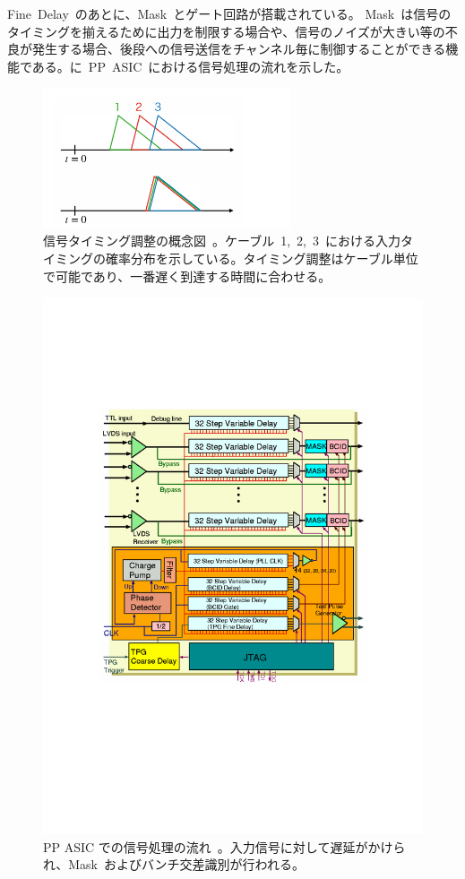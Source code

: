Fine~Delay~のあとに、Mask~とゲート回路が搭載されている。
Mask~は信号のタイミングを揃えるために出力を制限する場合や、信号のノイズが大きい等の不良が発生する場合、後段への信号送信をチャンネル毎に制御することができる機能である。に~PP~ASIC~における信号処理の流れを示した。
\begin{figure}[tbp]
        \centering   
        \includegraphics[width=0.65\textwidth,page=1]{img/slide/slide.pdf}
        \caption[信号タイミング調整の概念図]{信号タイミング調整の概念図~\cite{URL:09}。ケーブル~1,~2,~3~における入力タイミングの確率分布を示している。タイミング調整はケーブル単位で可能であり、一番遅く到達する時間に合わせる。}
        \label{fig:delay}
\end{figure}

\begin{figure}[tbp]
        \centering   
        \includegraphics[width=\textwidth,page=1]{img/pdf/PP.pdf}
        \caption[PP ASIC での信号処理の流れ]
        {PP ASIC での信号処理の流れ~\cite{URL:05}。入力信号に対して遅延がかけられ、Mask~およびバンチ交差識別が行われる。}
        \label{fig:PP}
\end{figure}

